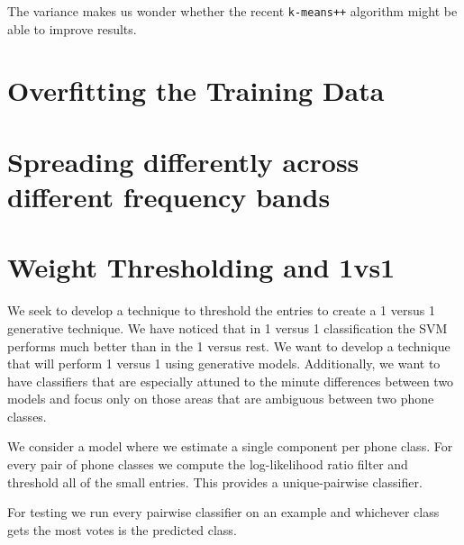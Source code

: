 \documentclass{article}
\begin{document}
The variance makes us wonder whether the recent \texttt{k-means++} algorithm
might be able to improve results.

\section{Overfitting the Training Data}

\section{Spreading differently across different frequency bands}

\section{Weight Thresholding and 1vs1}

We seek to develop a technique to threshold the entries to create a 1 versus 1 generative technique. We have noticed
that in 1 versus 1 classification the SVM performs much better than in the 1 versus rest. We want to develop
a technique that will perform 1 versus 1 using generative models.  Additionally, we want to have classifiers that 
are especially attuned to the minute differences between two models and focus only on those areas that
are ambiguous between two phone classes.

We consider a model where we estimate a single component per phone class.  For every pair of phone classes
we compute the log-likelihood ratio filter and threshold all of the small entries.  This provides a unique-pairwise
classifier.

For testing we run every pairwise classifier on an example and whichever class gets the most votes is the predicted class.
\end{document}
